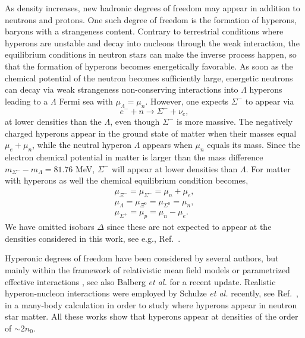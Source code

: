 \begin{multicols}{2}
As density increases, new hadronic degrees of freedom may appear in addition
to neutrons and protons. 
One such degree of freedom is the formation of hyperons, baryons with a
strangeness content. 
Contrary to terrestrial conditions where hyperons are unstable and decay 
into nucleons through the weak interaction, the equilibrium conditions
in neutron stars can make the inverse process happen, so that the 
formation of hyperons becomes energetically favorable.      
As soon as the chemical potential
of the neutron becomes sufficiently large, energetic neutrons
can decay via weak strangeness non-conserving interactions
into $\Lambda$ hyperons leading to a $\Lambda$ Fermi sea
with $\mu_{\Lambda}=\mu_n$. 
However, one expects $\Sigma^-$ to appear via
\begin{equation}
    e^-+n \rightarrow \Sigma^- +\nu_e,
\end{equation}
at lower densities than the $\Lambda$, even though $\Sigma^-$ is more
massive. The negatively charged hyperons
appear in the ground state of matter when their masses
equal $\mu_e+\mu_n$, while the neutral hyperon $\Lambda$ 
appears when $\mu_n$ equals its mass. Since the 
electron chemical potential in matter is larger than 
the mass difference $m_{\Sigma^-}-m_{\Lambda}= 81.76$ MeV,
$\Sigma^-$ will appear at lower densities than $\Lambda$.
For matter with hyperons as well 
the chemical equilibrium condition becomes,
\begin{eqnarray}
    \mu_{\Xi^-}=\mu_{\Sigma^-} = \mu_n + \mu_e, \nonumber \\ 
    \mu_{\Lambda} = \mu_{\Xi^0}=\mu_{\Sigma^0} = \mu_n , \nonumber \\
    \mu_{\Sigma^+} = \mu_p = \mu_n - \mu_e .
    \label{eq:beta_baryonicmatter}
\end{eqnarray}
We have omitted isobars $\Delta$ 
since these are not expected to appear at the densities considered 
in this work, see e.g., Ref.\ \cite{prakash97}.

Hyperonic degrees of freedom have been considered by several authors,
but mainly within the framework of relativistic 
mean field models \cite{glendenning92,prakash97,pke95,ms96} or parametrized
effective interactions \cite{bg97}, see also Balberg {\em et al.} \cite{blc99}
for a recent update. Realistic hyperon-nucleon interactions
were employed by Schulze {\em et al.}  recently, see Ref.\ \cite{bbs98},
in a many-body calculation in order to study 
where hyperons appear in neutron star matter.  
All these works show that hyperons appear at densities of the order of
$\sim 2n_0$.


\end{multicols}
